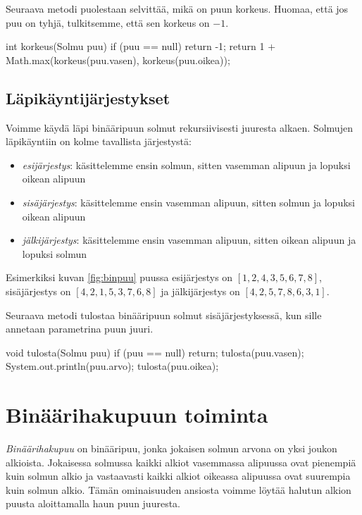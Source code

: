 Seuraava metodi puolestaan selvittää, mikä on puun korkeus.
Huomaa, että jos puu on tyhjä, tulkitsemme,
että sen korkeus on $-1$.

\begin{code}
int korkeus(Solmu puu) {
    if (puu == null) return -1;
    return 1 + Math.max(korkeus(puu.vasen), korkeus(puu.oikea));
}
\end{code}

\subsection{Läpikäyntijärjestykset}

Voimme käydä läpi binääripuun solmut rekursiivisesti
juuresta alkaen.
Solmujen läpikäyntiin on kolme tavallista järjestystä:

\begin{itemize}
\item \emph{esijärjestys}: käsittelemme ensin solmun, sitten vasemman alipuun
ja lopuksi oikean alipuun
\item \emph{sisäjärjestys}: käsittelemme ensin vasemman alipuun, sitten solmun
ja lopuksi oikean alipuun
\item \emph{jälkijärjestys}: käsittelemme ensin vasemman alipuun,
sitten oikean alipuun ja lopuksi solmun
\end{itemize}

Esimerkiksi kuvan \ref{fig:binpuu} puussa
esijärjestys on $[1,2,4,3,5,6,7,8]$,
sisäjärjes\-tys on $[4,2,1,5,3,7,6,8]$ ja
jälkijärjestys on $[4,2,5,7,8,6,3,1]$.

Seuraava metodi tulostaa binääripuun solmut
sisäjärjestyksessä, kun sille annetaan parametrina
puun juuri.

\begin{code}
void tulosta(Solmu puu) {
    if (puu == null) return;
    tulosta(puu.vasen);
    System.out.println(puu.arvo);
    tulosta(puu.oikea);
}
\end{code}

\section{Binäärihakupuun toiminta}

\emph{Binäärihakupuu} on binääripuu, jonka jokaisen solmun
arvona on yksi joukon alkioista.
Jokaisessa solmussa
kaikki alkiot vasemmassa alipuussa ovat pienempiä
kuin solmun alkio ja vastaavasti kaikki alkiot
oikeassa alipuussa ovat suurempia kuin solmun alkio.
Tämän ominaisuuden ansiosta voimme löytää halutun
alkion puusta aloittamalla haun puun juuresta.

